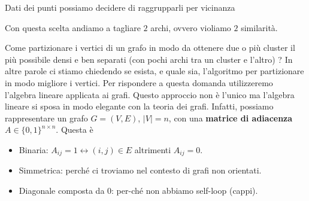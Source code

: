 \documentclass[12pt]{report}
\begin{document}
\begin{exmp}
    Dati dei punti possiamo decidere di raggrupparli per vicinanza

    \noindent
    Con questa scelta andiamo a tagliare $2$ archi, ovvero violiamo $2$ similarità.
\end{exmp}

\noindent 
Come partizionare i vertici di un grafo in modo da ottenere due o più cluster il più possibile densi e ben separati (con pochi archi tra un cluster e l'altro) ? In altre parole ci stiamo chiedendo se esista, e quale sia, l'algoritmo per partizionare in modo migliore i vertici. 
Per rispondere a questa domanda utilizzeremo l'algebra lineare applicata ai grafi. Questo approccio non è l'unico ma l'algebra lineare si sposa in modo elegante con la teoria dei grafi. Infatti, possiamo rappresentare un grafo $G=(V,E)$, $|V| = n$, con una \textbf{matrice di adiacenza}  $A \in \{0,1\}^{n \times n}$. Questa è 

\begin{itemize}
    \item Binaria: $A_{ij} = 1 \longleftrightarrow (i,j) \in E$ altrimenti $A_{ij} = 0$.
    \item Simmetrica: perché ci troviamo nel contesto di grafi non orientati.
    \item Diagonale composta da $0$: per-ché non abbiamo self-loop (cappi).
\end{itemize}
\end{document}
